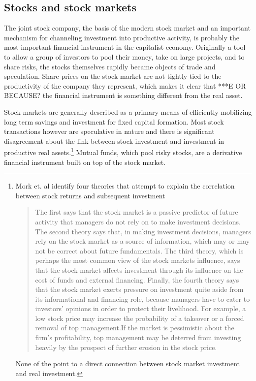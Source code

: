 
\subsection{Stocks and stock markets}
The \gls{joint stock company}, the basis of the modern stock market and an important mechanism for channeling investment  into productive activity,  is probably the most important financial instrument in the capitalist economy. Originally a tool to allow a group of investors to pool their money, take on large projects, and to share risks, the stocks themselves rapidly became objects of trade and speculation. Share prices on the stock market are not tightly tied to the productivity of the company they represent, which makes it clear that ***E OR BECAUSE?   the financial instrument is something different from the real asset. 

Stock markets are  generally described as a primary means of efficiently mobilizing long term savings and investment for  fixed capital formation.\cite{azfarMarketMobilizedCapital2003} Most stock transactions however are speculative in nature and there is significant disagreement about the link between stock investment and investment in productive real assets.\footnote{Mork et. al \cite{morckStockMarketInvestment1990} identify four theories that attempt to explain the correlation between stock returns and subsequent investment \begin{quotation}The first says that the stock market is a passive predictor of future activity that managers do not rely on to make investment decisions. The second theory says that, in making investment decisions, managers rely on the stock market as a source of information, which may or may not be correct about future fundamentals. The third theory, which is perhaps the most common view of the stock markets influence, says that the stock market affects investment through its influence on the cost of funds and external financing. Finally, the fourth theory says that the stock market exerts pressure on investment quite aside from its informational and financing role, because managers have to cater to investors' opinions in order to protect their livelihood. For example, a low stock price may increase the probability of a takeover or a forced removal of top management.If the market is pessimistic about the firm's profitability, top management may be deterred from investing heavily by the prospect of further erosion in the stock  price.\end{quotation} None of the point to a direct connection between stock market investment and real investment.}  Mutual funds, which pool risky stocks, are a derivative  financial instrument built on top of the stock market.


